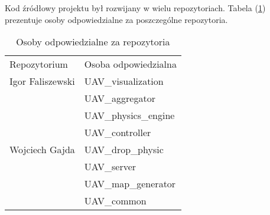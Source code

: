 \newpage
Kod źródłowy projektu był rozwijany w wielu repozytoriach.
Tabela (\ref{rep_rep}) prezentuje osoby odpowiedzialne za poszczególne repozytoria.

\renewcommand{\arraystretch}{1.1}
\begin{table}[!h]
	\centering
	\begin{tabular}{|m{}|m{}|} 
		\hline
		\rowcolor{Gray}
		Repozytorium &  Osoba odpowiedzialna \\
		\multirow{1}{12em}{Igor Faliszewski} 
		& UAV\_visualization \\
		\hline
		\multirow{7}{12em}{{Wojciech Gajda}} 
		& UAV\_aggregator \\
		& UAV\_physics\_engine\\
		& UAV\_controller \\
		& UAV\_drop\_physic \\
		& UAV\_server \\
		& UAV\_map\_generator \\
		& UAV\_common \\
		\hline
	\end{tabular}
	\caption*{Osoby odpowiedzialne za repozytoria}
	\label{rep_rep}
\end{table}